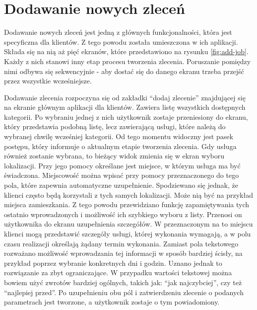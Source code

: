 \section{Dodawanie nowych zleceń}

Dodawanie nowych zleceń jest jedną z głównych funkcjonalności, która jest specyficzna dla klientów. Z tego powodu została umieszczona w ich aplikacji. Składa się na nią aż pięć ekranów, które przedstawiono na rysunku \ref{fig:add-job}. Każdy z nich stanowi inny etap procesu tworzenia zlecenia. Poruszanie pomiędzy nimi odbywa się sekwencyjnie - aby dostać się do danego ekranu trzeba przejść przez wszystkie wcześniejsze. 

Dodawanie zlecenia rozpoczyna się od zakładki \enquote{dodaj zlecenie} znajdującej się na ekranie głównym aplikacji dla klientów. Zawiera listę wszystkich dostępnych kategorii. Po wybraniu jednej z nich użytkownik zostaje przeniesiony do ekranu, który przedstawia podobną listę, lecz zawierającą usługi, które należą do wybranej chwilę wcześniej kategorii. Od tego momentu widoczny jest pasek postępu, który informuje o aktualnym etapie tworzenia zlecenia. Gdy usługa również zostanie wybrana, to bieżący widok zmienia się w ekran wyboru lokalizacji. Przy jego pomocy określane jest miejsce, w którym usługa ma być świadczona. Miejscowość można wpisać przy pomocy przeznaczonego do tego pola, które zapewnia automatyczne uzupełnienie. Spodziewano się jednak, że klienci często będą korzystali z tych samych lokalizacji. Może nią być na przykład miejsca zamieszkania. Z tego powodu przewidziano funkcję zapamiętywania tych ostatnio wprowadzonych i możliwość ich szybkiego wyboru z listy. Przenosi on użytkownika do ekranu uzupełnienia szczegółów. W przeznaczonym na to miejscu klienci mogą przedstawić szczegóły usługi, której wykonania wymagają, a w polu czasu realizacji określają żądany termin wykonania. Zamiast pola tekstowego rozważano możliwość wprowadzania tej informacji w sposób bardziej ścisły, na przykład poprzez wybranie konkretnych dni i godzin. Uznano jednak to rozwiązanie za zbyt ograniczające. W przypadku wartości tekstowej można bowiem użyć zwrotów bardziej ogólnych, takich jak: \enquote{jak najczybciej}, czy też \enquote{najlepiej przed}. Po uzupełnieniu obu pól i zatwierdzeniu zlecenie o podanych parametrach jest tworzone, a użytkownik zostaje o tym powiadomiony.

